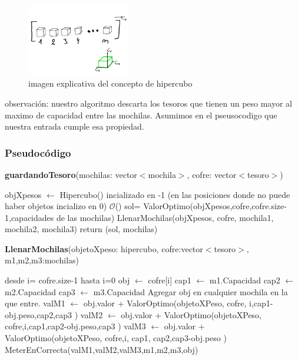 \documentclass[spanish,12pt]{article}
\begin{document}
\begin{figure}[H]
\centering
\includegraphics[width=0.4\textwidth]{hipercubo}
\caption{imagen explicativa del concepto de hipercubo}
\end{figure}


observación: nuestro algoritmo descarta los tesoros que tienen un peso mayor al maximo de capacidad entre las mochilas. Asumimos en el pseusocodigo que nuestra entrada cumple esa propiedad.


\subsubsection{Pseudocódigo}

\begin{algorithm}[H]{\textbf{guardandoTesoro}(mochilas: vector$<$mochila$>$, cofre: vector$<$tesoro$>$)}
	\begin{algorithmic}[1]
		\State objXpesos $\gets$ Hipercubo() incializado en -1 \Comment (en las posiciones donde no puede haber objetos incializo en 0) $\mathcal{O}$()
		\State sol= ValorOptimo(objXpesos,cofre,cofre.size-1,capacidades de las mochilas)
		\State LlenarMochilas(objXpesos, cofre, mochila1, mochila2, mochila3)
		\State return (sol, mochilas)
	\end{algorithmic}
\end{algorithm}



\begin{algorithm}[H]{\textbf{LlenarMochilas}(objetoXpeso: hipercubo, cofre:vector$<$tesoro$>$, m1,m2,m3:mochilas)}
	\begin{algorithmic}[1]
		\State desde i= cofre.size-1 hasta i=0
			\State obj $\gets$ cofre[i]
			\State cap1 $\gets$ m1.Capacidad
			\State cap2 $\gets$ m2.Capacidad
			\State cap3 $\gets$ m3.Capacidad
				\State Agregar obj en cualquier mochila en la que entre.
			\Else
				\State valM1 $\gets$ obj.valor + ValorOptimo(objetoXPeso, cofre, i,cap1-obj.peso,cap2,cap3 )
				\State valM2 $\gets$ obj.valor + ValorOptimo(objetoXPeso, cofre,i,cap1,cap2-obj.peso,cap3 )
				\State valM3 $\gets$ obj.valor + ValorOptimo(objetoXPeso, cofre,i, cap1, cap2,cap3-obj.peso )	
				\State MeterEnCorrecta(valM1,valM2,valM3,m1,m2,m3,obj)
			\EndIf

	\end{algorithmic}
\end{algorithm}
\end{document}
